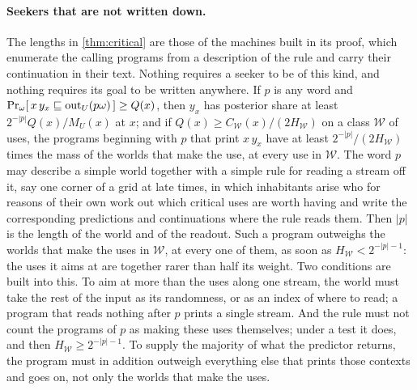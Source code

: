 \paragraph{Seekers that are not written down.} The lengths in \cref{thm:critical} are those of the machines
built in its proof, which enumerate the calling programs from a description of the rule and carry their
continuation in their text. Nothing requires a seeker to be of this kind, and nothing requires its goal to be
written anywhere. If $p$ is any word and $\Pr_\omega[\,x\,y_x\sqsubseteq\mathrm{out}_U(p\omega)\,]\ge Q(x)$, then $y_x$ has
posterior share at least $2^{-|p|}Q(x)/M_U(x)$ at $x$; and if $Q(x)\ge C_{\mathcal W}(x)/(2H_{\mathcal W})$ on
a class $\mathcal W$ of uses, the programs beginning with $p$ that print $x\,y_x$ have at least
$2^{-|p|}/(2H_{\mathcal W})$ times the mass of the worlds that make the use, at every use in $\mathcal W$. The
word $p$ may describe a simple world together with a simple rule for reading a stream off it, say one corner
of a grid at late times, in which inhabitants arise who for reasons of their own work out which critical uses
are worth having and write the corresponding predictions and continuations where the rule reads them. Then
$|p|$ is the length of the world and of the readout. Such a program outweighs the worlds that make the uses
in $\mathcal W$, at every one of them, as soon as $H_{\mathcal W}<2^{-|p|-1}$: the uses it aims at are
together rarer than half its weight. Two conditions are built into this. To aim at more than the uses along
one stream, the world must take the rest of the input as its randomness, or as an index of where to read; a
program that reads nothing after $p$ prints a single stream. And the rule must not count the programs of $p$
as making these uses themselves; under a test it does, and then $H_{\mathcal W}\ge2^{-|p|-1}$. To supply the
majority of what the predictor returns, the program must in addition outweigh everything else that prints
those contexts and goes on, not only the worlds that make the uses.
